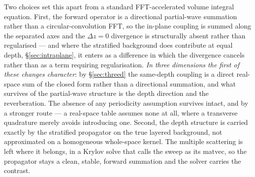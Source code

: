 \documentclass[11pt,a4paper]{article}
\begin{document}
Two choices set this apart from a standard FFT-accelerated volume integral equation. First, the
forward operator is a directional partial-wave summation rather than a circular-convolution FFT,
so the in-plane coupling is summed along the separated axes and the $\Delta z=0$ divergence is
structurally absent rather than regularised --- and where the stratified background does
contribute at equal depth, \S\ref{sec:intraplane}, it enters as a difference in which the
divergence cancels rather than as a term requiring regularisation. \emph{In three dimensions the
first of these changes character}: by \S\ref{sec:threed} the same-depth coupling is a direct
real-space sum of the closed form rather than a directional summation, and what survives of the
partial-wave structure is the depth direction and the reverberation. The absence of any
periodicity assumption survives intact, and by a stronger route --- a real-space table assumes
none at all, where a transverse quadrature merely avoids introducing one. Second, the depth structure
is carried exactly by the stratified propagator on the true layered background, not approximated
on a homogeneous whole-space kernel. The multiple scattering is left where it belongs, in a Krylov solve that
calls the sweep as its matvec, so the propagator stays a clean, stable, forward summation and
the solver carries the contrast.
\end{document}
